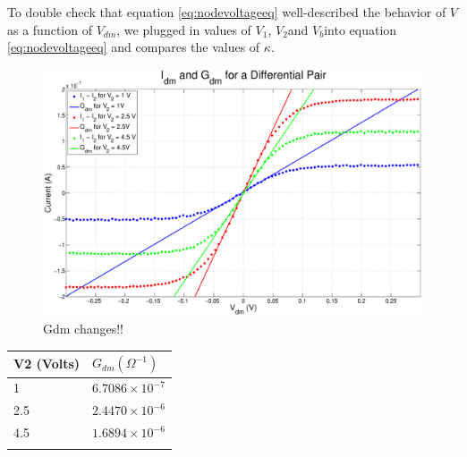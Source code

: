 \documentclass{article}
\newcommand{\Vb}{{$V_{b}$}}
\newcommand{\Vtwo}{{$V_{2}$}}
\newcommand{\Vone}{{$V_{1}$}}
\newcommand{\Vdm}{{$V_{dm}$}}
\begin{document}
To double check that equation \ref{eq:nodevoltageeq} well-described the behavior of $V$ as a function of \Vdm, we plugged in values of \Vone, \Vtwo and \Vb into equation \ref{eq:nodevoltageeq} and compares the values of $\kappa$. 


\begin{figure}[H]
\centering
\includegraphics[width=\linewidth]{./Figures/Gdm.eps}
\caption{Gdm changes!!}
\label{fig:gdm}
\end{figure}

\begin{table}[h]
\begin{center}
    \begin{tabular}{ l | l  }
        V2 (Volts) & $G_{dm} (\Omega^{-1})$ \\
        \hline
        1 & $6.7086 \times 10^{-7}$ \\
        2.5 & $2.4470 \times 10^{-6}$ \\
        4.5 & $1.6894 \times 10^{-6}$ \\
        \label{tb:gdm}
    \end{tabular}
\end{center}
\end{table}


\end{document}
